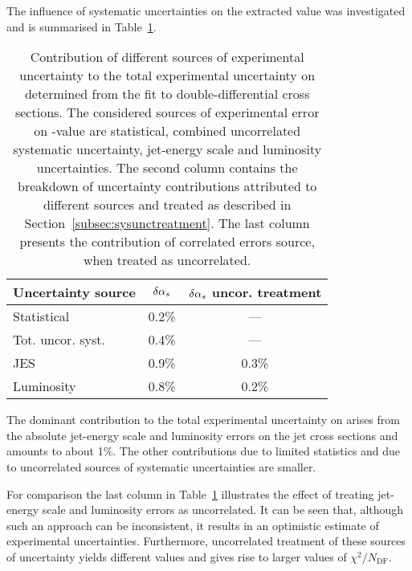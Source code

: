 The influence of systematic uncertainties on the extracted \asz value was investigated and is summarised in Table~\ref{tab:asuncbreakdown}.
\begin{table}
\centering
\begin{tabular}{|l|c|c|}
 \hline
 Uncertainty source & $\delta\mbox{$\alpha_{s}$}$ & $\delta\mbox{$\alpha_{s}$}$ uncor. treatment\\
 \hline\hline
 Statistical       & 0.2\% & ---     \\
 Tot. uncor. syst. & 0.4\% & ---     \\
 JES               & 0.9\% & 0.3\%   \\
 Luminosity        & 0.8\% & 0.2\%   \\
 \hline
\end{tabular}
\caption{Contribution of different sources of experimental uncertainty to the total experimental uncertainty on \asz determined from the fit to double-differential cross sections. The considered sources of experimental error on \asz-value are statistical, combined uncorrelated systematic uncertainty, jet-energy scale and luminosity uncertainties. The second column contains the breakdown of uncertainty contributions attributed to different sources and treated as described in Section~\ref{subsec:sysunctreatment}. The last column presents the contribution of correlated errors source, when treated as uncorrelated.}
\label{tab:asuncbreakdown}
\end{table}

The dominant contribution to the total experimental uncertainty on \as arises from the absolute jet-energy scale and luminosity errors on the jet cross sections and amounts to about 1\%. The other contributions due to limited statistics and due to uncorrelated sources of systematic uncertainties are smaller. 

For comparison the last column in Table~\ref{tab:asuncbreakdown} illustrates the effect of treating jet-energy scale and luminosity errors as uncorrelated. It can be seen that, although such an approach can be inconsistent, it results in an optimistic estimate of experimental uncertainties. Furthermore, uncorrelated treatment of these sources of uncertainty yields different \as values and gives rise to larger values of $\chi^2/N_\text{DF}$. 